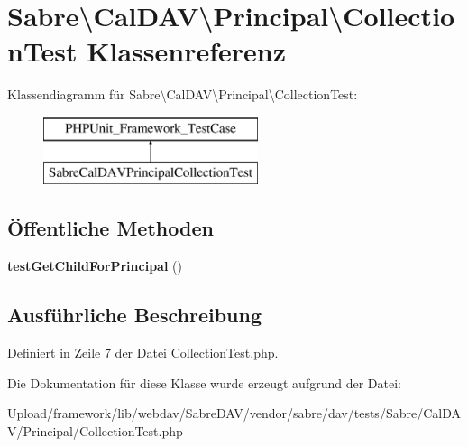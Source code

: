 \hypertarget{class_sabre_1_1_cal_d_a_v_1_1_principal_1_1_collection_test}{}\section{Sabre\textbackslash{}Cal\+D\+AV\textbackslash{}Principal\textbackslash{}Collection\+Test Klassenreferenz}
\label{class_sabre_1_1_cal_d_a_v_1_1_principal_1_1_collection_test}
Klassendiagramm für Sabre\textbackslash{}Cal\+D\+AV\textbackslash{}Principal\textbackslash{}Collection\+Test\+:\begin{figure}[H]
\begin{center}
\leavevmode
\includegraphics[height=2.000000cm]{class_sabre_1_1_cal_d_a_v_1_1_principal_1_1_collection_test}
\end{center}
\end{figure}
\subsection*{Öffentliche Methoden}
\begin{DoxyCompactItemize}
\item 
\mbox{\label{class_sabre_1_1_cal_d_a_v_1_1_principal_1_1_collection_test_a1935f16c396368d82ba328c66b6061e3}} 
{\bfseries test\+Get\+Child\+For\+Principal} ()
\end{DoxyCompactItemize}


\subsection{Ausführliche Beschreibung}


Definiert in Zeile 7 der Datei Collection\+Test.\+php.



Die Dokumentation für diese Klasse wurde erzeugt aufgrund der Datei\+:\begin{DoxyCompactItemize}
\item 
Upload/framework/lib/webdav/\+Sabre\+D\+A\+V/vendor/sabre/dav/tests/\+Sabre/\+Cal\+D\+A\+V/\+Principal/Collection\+Test.\+php\end{DoxyCompactItemize}
